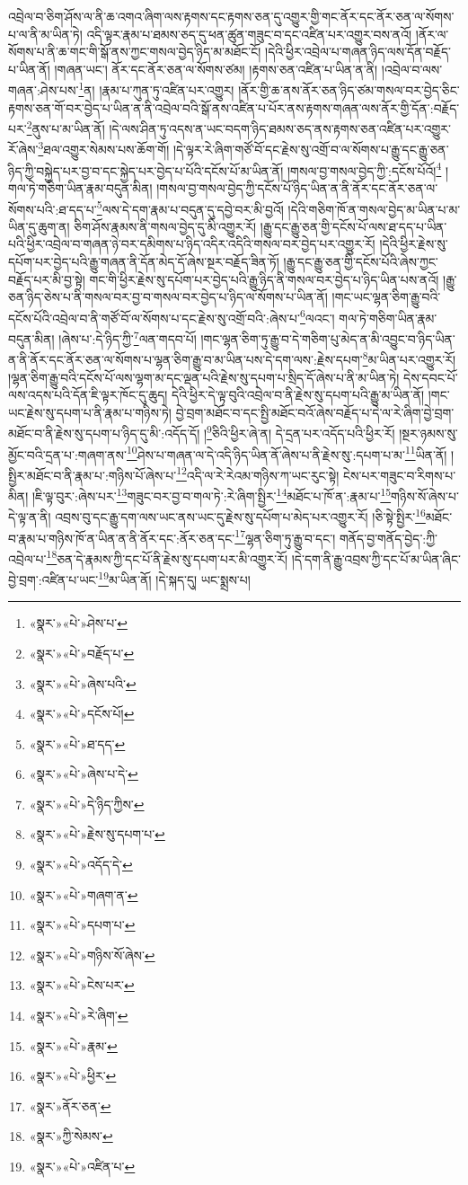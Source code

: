 འབྲེལ་བ་ཅིག་ཤོས་ལ་ནི་ཆ་འགའ་ཞིག་ལས་རྟགས་དང་རྟགས་ཅན་དུ་འགྱུར་གྱི་གང་ནོར་དང་ནོར་ཅན་ལ་སོགས་པ་ལ་ནི་མ་ཡིན་ཏེ། འདི་ལྟར་རྣམ་པ་ཐམས་ཅད་དུ་ཕན་ཚུན་གཟུང་བ་དང་འཛིན་པར་འགྱུར་བས་ནའོ། །ནོར་ལ་སོགས་པ་ནི་ཆ་གང་གི་སྒོ་ནས་ཀྱང་གསལ་བྱེད་ཉིད་མ་མཐོང་ངོ། །དེའི་ཕྱིར་འབྲེལ་པ་གཞན་ཉིད་ལས་དོན་བརྗོད་པ་ཡིན་ནོ། །གཞན་ཡང་། ནོར་དང་ནོར་ཅན་ལ་སོགས་ཙམ། །རྟགས་ཅན་འཛིན་པ་ཡིན་ན་ནི། །འབྲེལ་བ་ལས་གཞན་:ཤེས་པས་\footnote{«སྣར་»«པེ་»ཤེས་པ་}ན། །རྣམ་པ་ཀུན་ཏུ་འཛིན་པར་འགྱུར། །ནོར་གྱི་ཆ་ནས་ནོར་ཅན་ཉིད་ཙམ་གསལ་བར་བྱེད་ཅིང་རྟགས་ཅན་གོ་བར་བྱེད་པ་ཡིན་ན་ནི་འབྲེལ་བའི་སྒོ་ནས་འཛིན་པ་པོར་ནས་རྟགས་གཞན་ལས་ནོར་གྱི་དོན་:བརྗོད་པར་\footnote{«སྣར་»«པེ་»བརྗོད་པ་}ནུས་པ་མ་ཡིན་ནོ། །དེ་ལས་ཤིན་ཏུ་འདས་ན་ཡང་བདག་ཉིད་ཐམས་ཅད་ནས་རྟགས་ཅན་འཛིན་པར་འགྱུར་རོ་ཞེས་\footnote{«སྣར་»«པེ་»ཞེས་པའི་}ཐལ་འགྱུར་སེམས་པས་ཆོག་གོ། །དེ་ལྟར་རེ་ཞིག་གཙོ་བོ་དང་རྗེས་སུ་འགྲོ་བ་ལ་སོགས་པ་རྒྱུ་དང་རྒྱུ་ཅན་ཉིད་ཀྱི་བསྐྱེད་པར་བྱ་བ་དང་སྐྱེད་པར་བྱེད་པ་པོའི་དངོས་པོ་མ་ཡིན་ནོ། །གསལ་བྱ་གསལ་བྱེད་ཀྱི་:དངོས་པོའོ།\footnote{«སྣར་»«པེ་»དངོས་པོ།} །གལ་ཏེ་གཅིག་ཡིན་རྣམ་བདུན་མིན། །གསལ་བྱ་གསལ་བྱེད་ཀྱི་དངོས་པོ་ཉིད་ཡིན་ན་ནི་ནོར་དང་ནོར་ཅན་ལ་སོགས་པའི་:ཐ་དད་པ་\footnote{«སྣར་»«པེ་»ཐ་དད་}ལས་དེ་དག་རྣམ་པ་བདུན་དུ་དབྱེ་བར་མི་བྱའོ། །དེའི་གཅིག་ཁོ་ན་གསལ་བྱེད་མ་ཡིན་པ་མ་ཡིན་དུ་ཆུག་ན། ཅིག་ཤོས་རྣམས་ནི་གསལ་བྱེད་དུ་མི་འགྱུར་རོ། །རྒྱུ་དང་རྒྱུ་ཅན་གྱི་དངོས་པོ་ལས་ཐ་དད་པ་ཡིན་པའི་ཕྱིར་འབྲེལ་བ་གཞན་ཉེ་བར་དམིགས་པ་ཉིད་འདིར་འདིའི་གསལ་བར་བྱེད་པར་འགྱུར་རོ། །དེའི་ཕྱིར་རྗེས་སུ་དཔོག་པར་བྱེད་པའི་རྒྱུ་གཞན་ནི་དོན་མེད་དོ་ཞེས་སྔར་བརྗོད་ཟིན་ཏོ། །རྒྱུ་དང་རྒྱུ་ཅན་གྱི་དངོས་པོའི་ཞེས་ཀྱང་བརྗོད་པར་མི་བྱ་སྟེ། གང་གི་ཕྱིར་རྗེས་སུ་དཔོག་པར་བྱེད་པའི་རྒྱུ་ཉིད་ནི་གསལ་བར་བྱེད་པ་ཉིད་ཡིན་པས་ནའོ། །རྒྱུ་ཅན་ཉིད་ཅེས་པ་ནི་གསལ་བར་བྱ་བ་གསལ་བར་བྱེད་པ་ཉིད་ལ་སོགས་པ་ཡིན་ནོ། །གང་ཡང་ལྷན་ཅིག་རྒྱུ་བའི་དངོས་པོའི་འབྲེལ་བ་ནི་གཙོ་བོ་ལ་སོགས་པ་དང་རྗེས་སུ་འགྲོ་བའི་:ཞེས་པ་\footnote{«སྣར་»«པེ་»ཞེས་པ་དེ་}ལའང་། གལ་ཏེ་གཅིག་ཡིན་རྣམ་བདུན་མིན། །ཞེས་པ་:དེ་ཉིད་ཀྱི་\footnote{«སྣར་»«པེ་»དེ་ཉིད་ཀྱིས་}ལན་གདབ་པོ། །གང་ལྷན་ཅིག་ཏུ་རྒྱུ་བ་དེ་གཅིག་པུ་མེད་ན་མི་འབྱུང་བ་ཉིད་ཡིན་ན་ནི་ནོར་དང་ནོར་ཅན་ལ་སོགས་པ་ལྷན་ཅིག་རྒྱུ་བ་མ་ཡིན་པས་དེ་དག་ལས་:རྗེས་དཔག་\footnote{«སྣར་»«པེ་»རྗེས་སུ་དཔག་པ་}མ་ཡིན་པར་འགྱུར་རོ། །ལྷན་ཅིག་རྒྱུ་བའི་དངོས་པོ་ལས་ལྷག་མ་དང་ལྡན་པའི་རྗེས་སུ་དཔག་པ་སྲིད་དོ་ཞེས་པ་ནི་མ་ཡིན་ཏེ། དེས་དབང་པོ་ལས་འདས་པའི་དོན་ཇི་ལྟར་ཁོང་དུ་ཆུད། དེའི་ཕྱིར་དེ་ལྟ་བུའི་འབྲེལ་བ་ནི་རྗེས་སུ་དཔག་པའི་རྒྱུ་མ་ཡིན་ནོ། །གང་ཡང་རྗེས་སུ་དཔག་པ་ནི་རྣམ་པ་གཉིས་ཏེ། བྱེ་བྲག་མཐོང་བ་དང་སྤྱི་མཐོང་བའོ་ཞེས་བརྗོད་པ་དེ་ལ་རེ་ཞིག་བྱེ་བྲག་མཐོང་བ་ནི་རྗེས་སུ་དཔག་པ་ཉིད་དུ་མི་:འདོད་དོ། །\footnote{«སྣར་»«པེ་»འདོད་དེ་}ཅིའི་ཕྱིར་ཞེ་ན། དེ་དྲན་པར་འདོད་པའི་ཕྱིར་རོ། །སྔར་ཉམས་སུ་མྱོང་བའི་དྲན་པ་:གཞག་ནས་\footnote{«སྣར་»«པེ་»གཞག་ན་}ཤེས་པ་གཞན་ལ་དེ་འདི་ཉིད་ཡིན་ནོ་ཞེས་པ་ནི་རྗེས་སུ་:དཔག་པ་མ་\footnote{«སྣར་»«པེ་»དཔག་པ་}ཡིན་ནོ། །སྤྱིར་མཐོང་བ་ནི་རྣམ་པ་:གཉིས་པོ་ཞེས་པ་\footnote{«སྣར་»«པེ་»གཉིས་སོ་ཞེས་}འདི་ལ་རེ་རེའམ་གཉིས་ཀ་ཡང་རུང་སྟེ། ངེས་པར་གཟུང་བ་རིགས་པ་མིན། །ཇི་ལྟ་བུར་:ཞེས་པར་\footnote{«སྣར་»«པེ་»ངེས་པར་}གཟུང་བར་བྱ་བ་གལ་ཏེ་:རེ་ཞིག་སྤྱིར་\footnote{«སྣར་»«པེ་»རེ་ཞིག་}མཐོང་པ་ཁོ་ན་:རྣམ་པ་\footnote{«སྣར་»«པེ་»རྣམ་}གཉིས་སོ་ཞེས་པ་དེ་ལྟ་ན་ནི། འབྲས་བུ་དང་རྒྱུ་དག་ལས་ཡང་ནས་ཡང་དུ་རྗེས་སུ་དཔོག་པ་མེད་པར་འགྱུར་རོ། །ཅི་སྟེ་སྤྱིར་\footnote{«སྣར་»«པེ་»ཕྱིར་}མཐོང་བ་རྣམ་པ་གཉིས་ཁོ་ན་ཡིན་ན་ནི་ནོར་དང་:ནོར་ཅན་དང་\footnote{«སྣར་»ནོར་ཅན་}ལྷན་ཅིག་ཏུ་རྒྱུ་བ་དང་། གནོད་བྱ་གནོད་བྱེད་:ཀྱི་འབྲེལ་པ་\footnote{«སྣར་»ཀྱི་སེམས་}ཅན་དེ་རྣམས་ཀྱི་དང་པོ་ནི་རྗེས་སུ་དཔག་པར་མི་འགྱུར་རོ། །དེ་དག་ནི་རྒྱུ་འབྲས་ཀྱི་དང་པོ་མ་ཡིན་ཞིང་བྱེ་བྲག་:འཛིན་པ་ཡང་\footnote{«སྣར་»«པེ་»འཛིན་པ་}མ་ཡིན་ནོ། །དེ་སྐད་དུ། ཡང་སྨྲས་པ། 